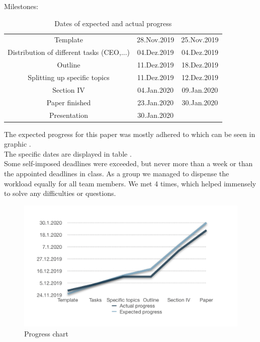 Milestones:
\begin{table}[H]
\caption{Dates of expected and actual progress}
\centering
\begin{tabular}{ccc}
Template & 28.Nov.2019 & 25.Nov.2019\\
Distribution of different tasks (CEO,...) & 04.Dez.2019 &04.Dez.2019\\
Outline & 11.Dez.2019& 18.Dez.2019\\
Splitting up specific topics & 11.Dez.2019&12.Dez.2019\\
Section IV & 04.Jan.2020&09.Jan.2020\\
Paper finished& 23.Jan.2020& 30.Jan.2020\\
Presentation & 30.Jan.2020& \\
\end{tabular}
\end{table}
The expected progress for this paper was mostly adhered to which can be seen in graphic . \\
The specific dates are displayed in table .\\
Some self-imposed deadlines were exceeded, but never more than a week or than the appointed deadlines in class. As a group we managed to dispense the workload equally for all team members. We met 4 times, which helped immensely to solve any difficulties or questions. 

\begin{figure}[H]
\centering
\includegraphics[scale=0.5]{Progress_chart}
\caption{Progress chart}
\end{figure}

